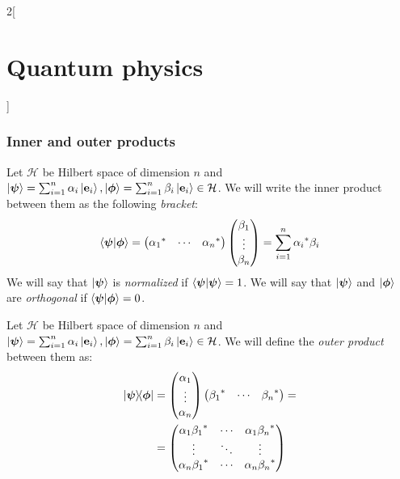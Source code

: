 \documentclass[../../../main.tex]{subfiles}
\begin{document}
\begin{multicols}{2}[\section{Quantum physics}]
  \subsubsection{Inner and outer products}
  \begin{definition}
    Let $\mathcal{H}$ be Hilbert space of dimension $n$ and $\ket{\boldsymbol{\mathrm{\psi}}}=\sum_{i=1}^n\alpha_i\ket{\boldsymbol{\mathrm{e}}_i},\ket{\boldsymbol{\mathrm{\phi}}}=\sum_{i=1}^n\beta_i\ket{\boldsymbol{\mathrm{e}}_i}\in\mathcal{H}$. We will write the inner product between them as the following \emph{bracket}: $$\braket{\boldsymbol{\mathrm{\psi}}}{\boldsymbol{\mathrm{\phi}}}=
      \begin{pmatrix}
        {\alpha_1}^* & \cdots & {\alpha_n}^*
      \end{pmatrix}
      \begin{pmatrix}
        \beta_1 \\
        \vdots  \\
        \beta_n
      \end{pmatrix}=\sum_{i=1}^n{\alpha_i}^*\beta_i$$
    We will say that $\ket{\boldsymbol{\mathrm{\psi}}}$ is \emph{normalized} if $\braket{\boldsymbol{\mathrm{\psi}}}=1$. We will say that $\ket{\boldsymbol{\mathrm{\psi}}}$ and $\ket{\boldsymbol{\mathrm{\phi}}}$ are \emph{orthogonal} if $\braket{\boldsymbol{\mathrm{\psi}}}{\boldsymbol{\mathrm{\phi}}}=0$.
  \end{definition}
  \begin{definition}
    Let $\mathcal{H}$ be Hilbert space of dimension $n$ and $\ket{\boldsymbol{\mathrm{\psi}}}=\sum_{i=1}^n\alpha_i\ket{\boldsymbol{\mathrm{e}}_i},\ket{\boldsymbol{\mathrm{\phi}}}=\sum_{i=1}^n\beta_i\ket{\boldsymbol{\mathrm{e}}_i}\in\mathcal{H}$. We will define the \emph{outer product} between them as:
    \begin{align*}
      \dyad{\vf\psi}{\vf{\phi}} & =
      \begin{pmatrix}
        \alpha_1 \\
        \vdots   \\
        \alpha_n
      \end{pmatrix}\begin{pmatrix}
                     {\beta_1}^* & \cdots & {\beta_n}^*
                   \end{pmatrix}= \\
                                & =
      \begin{pmatrix}
        \alpha_1{\beta_1}^* & \cdots & \alpha_1{\beta_n}^* \\
        \vdots              & \ddots & \vdots              \\
        \alpha_n{\beta_1}^* & \cdots & \alpha_n{\beta_n}^* \\
      \end{pmatrix}
    \end{align*}
  \end{definition}

\end{multicols}
\end{document}
